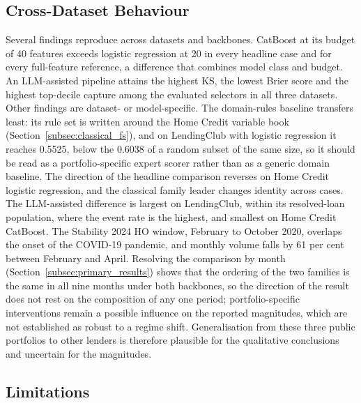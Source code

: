 \documentclass[final,5p,twocolumn]{elsarticle}
\begin{document}
\subsection{Cross-Dataset Behaviour}
\label{subsec:cross_dataset}

Several findings reproduce across datasets and backbones. CatBoost at its budget of 40 features exceeds logistic regression at 20 in every headline case and for every full-feature reference, a difference that combines model class and budget. An LLM-assisted pipeline attains the highest KS, the lowest Brier score and the highest top-decile capture among the evaluated selectors in all three datasets. Other findings are dataset- or model-specific. The domain-rules baseline transfers least: its rule set is written around the Home Credit variable book (Section~\ref{subsec:classical_fs}), and on LendingClub with logistic regression it reaches 0.5525, below the 0.6038 of a random subset of the same size, so it should be read as a portfolio-specific expert scorer rather than as a generic domain baseline. The direction of the headline comparison reverses on Home Credit logistic regression, and the classical family leader changes identity across cases. The LLM-assisted difference is largest on LendingClub, within its resolved-loan population, where the event rate is the highest, and smallest on Home Credit CatBoost. The Stability 2024 HO window, February to October 2020, overlaps the onset of the COVID-19 pandemic, and monthly volume falls by 61 per cent between February and April. Resolving the comparison by month (Section~\ref{subsec:primary_results}) shows that the ordering of the two families is the same in all nine months under both backbones, so the direction of the result does not rest on the composition of any one period; portfolio-specific interventions remain a possible influence on the reported magnitudes, which are not established as robust to a regime shift. Generalisation from these three public portfolios to other lenders is therefore plausible for the qualitative conclusions and uncertain for the magnitudes.

\subsection{Limitations}
\label{subsec:limitations}
\end{document}
